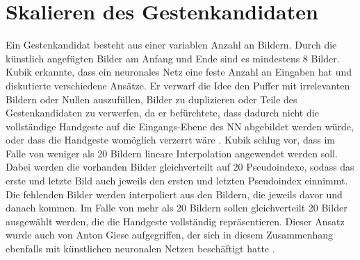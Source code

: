 \section{Skalieren des Gestenkandidaten}
\label{sec:scaling}
Ein Gestenkandidat besteht aus einer variablen Anzahl an Bildern. Durch die künstlich angefügten Bilder am Anfang und Ende sind es mindestens 8 Bilder. Kubik erkannte, dass ein neuronales Netz eine feste Anzahl an
Eingaben hat und diskutierte verschiedene Ansätze. Er verwarf die Idee den Puffer mit irrelevanten Bildern oder Nullen auszufüllen, Bilder zu duplizieren oder Teile des Gestenkandidaten zu verwerfen, da er
befürchtete, dass dadurch nicht die vollständige Handgeste auf die Eingangs-Ebene des NN abgebildet werden würde, oder dass die Handgeste womöglich verzerrt wäre \cite{kubikThesis}.
\newline
\newline
Kubik schlug vor, dass im Falle von weniger als 20 Bildern lineare Interpolation angewendet werden soll. Dabei werden die vorhanden Bilder gleichverteilt auf 20 Pseudoindexe, sodass das erste und letzte Bild auch
jeweils den ersten und letzten Pseudoindex einnimmt. Die fehlenden Bilder werden interpoliert aus den Bildern, die jeweils davor und danach kommen.
\newline
\newline
Im Falle von mehr als 20 Bildern sollen gleichverteilt 20 Bilder ausgewählt werden, die die Handgeste vollständig repräsentieren. Dieser Ansatz wurde auch von Anton Giese aufgegriffen, der sich in diesem Zusammenhang
ebenfalls mit künstlichen neuronalen Netzen beschäftigt hatte \cite{gieseThesis}.